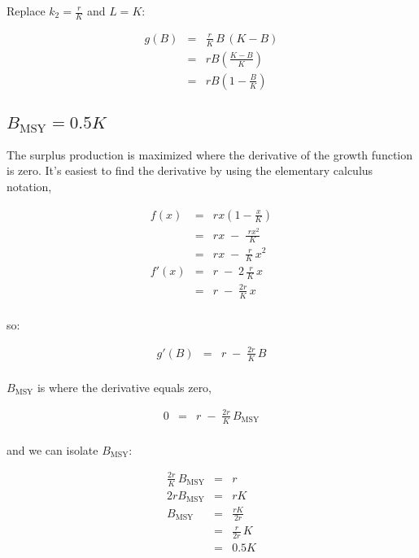\documentclass[fleqn]{article}
\newcommand{\msy}{_\mathrm{MSY}}
\begin{document}
Replace $k_2\!=\!\frac{r}{K}$ and $L=K$:

\begin{eqnarray*}
  g(B) &=& \frac{r}{K}\,B\,(K-B)           \\[1em]
  ~    &=& rB\left(\frac{K-B}{K}\right)\\[1em]
  ~    &=& rB\left(1-\frac{B}{K}\right)
\end{eqnarray*}

\newpage

\subsection{$B\msy=0.5K$}

The surplus production is maximized where the derivative of the growth function
is zero. It's easiest to find the derivative by using the elementary calculus
notation,

\begin{eqnarray*}
  f(x)  &=& rx\left(1-\frac{x}{K}\right)\\[1em]
  ~     &=& rx \;-\; \frac{\;rx^2}{K}   \\[1em]
  ~     &=& rx \;-\; \frac{\,r}{K}\,x^2 \\[1em]
  f'(x) &=& r \;-\; 2\,\frac{\,r}{K}\,x \\[1em]
  ~     &=& r \;-\; \frac{2r}{K}\,x     \\[1ex]
\end{eqnarray*}

so:

\begin{eqnarray*}
  g'(B) &=& r \;-\; \frac{2r}{K}\,B\\[1ex]
\end{eqnarray*}

$B\msy$ is where the derivative equals zero,

\begin{eqnarray*}
  0 &=& r \;-\; \frac{2r}{K}\,B\msy\\[1ex]
\end{eqnarray*}

and we can isolate $B\msy$:

\begin{eqnarray*}
  \frac{2r}{K}\,B\msy &=& r            \\[1em]
  2rB\msy             &=& rK           \\[1em]
  B\msy               &=& \frac{rK}{2r}\\[1em]
  &=& \frac{r}{2r}\,K                  \\[1em]
  &=& 0.5K                             \\[1ex]
\end{eqnarray*}
\end{document}
